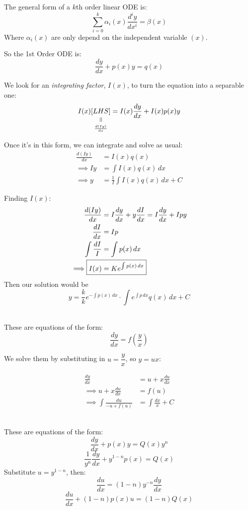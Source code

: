 \documentclass[twoside]{scrartcl}
\begin{document}

The general form of a $k$th order linear ODE is: 
\[\sum_{i=0}^k \alpha_i(x) \frac{d^iy}{dx^i} = \beta (x)\]
Where $\alpha_i(x)$ are only depend on the independent variable $(x)$. 

So the 1st Order ODE is: 
\[\frac{dy}{dx} + p(x)y = q(x)\]

We look for an \emph{integrating factor}, $I(x)$, to turn the equation into a separable one: 
\[I(x)\equalto{[LHS]}{\frac{d(Iy)}{dx}} = I(x)\frac{dy}{dx} + I(x)p(x)y\]

Once it's in this form, we can integrate and solve as usual: 
\[
\begin{aligned}
  \frac{d(Iy)}{dx} &= I(x)q(x)\\
  \implies Iy &= \int I(x)q(x)\,dx\\
  \implies y &= \frac{1}{I} \int I(x)q(x)\,dx + C
\end{aligned}
\]

Finding $I(x)$: 
\[
\begin{aligned}
  \frac{d(Iy)}{dx} &= I\frac{dy}{dx} + y\frac{dI}{dx} = I\frac{dy}{dx} + Ipy\\
  \frac{dI}{dx} &= Ip\\
  \int \frac{dI}{I} &= \int p(x)\,dx\\
  \implies \Aboxed{I(x) &= Ke^{\int p(x)\,dx}}
\end{aligned}
\]
Then our solution would be
\[y = \frac{k}{k} e^{-\int p(x)\,dx}\cdot \int e^{\int p\,dx}q(x)\,dx + C\]~

These are equations of the form: 
\[\frac{dy}{dx} = f\left(\frac{y}{x}\right)\]

We solve them by substituting in $u = \dfrac{y}{x}$, so $y = ux$:

\[
\begin{aligned}
  \frac{dy}{dx} &= u + x \frac{du}{dx}\\
  \implies u + x\frac{du}{dx} &= f(u)\\
  \implies \int \frac{du}{-u + f(u)} &= \int \frac{dx}{x} + C
\end{aligned}
\]~



These are equations of the form: 
\[\frac{dy}{dx} + p(x)y = Q(x)y^n\]
\[\frac{1}{y^n}\frac{dy}{dx} + y^{1-n}p(x) = Q(x)\]
Substitute $u = y^{1-n}$, then:
\[  \frac{du}{dx} = (1-n)y^{-n}\frac{dy}{dx}\]
\[  \frac{du}{dx} + (1-n)p(x)u = (1-n)Q(x)\]
\end{document}
